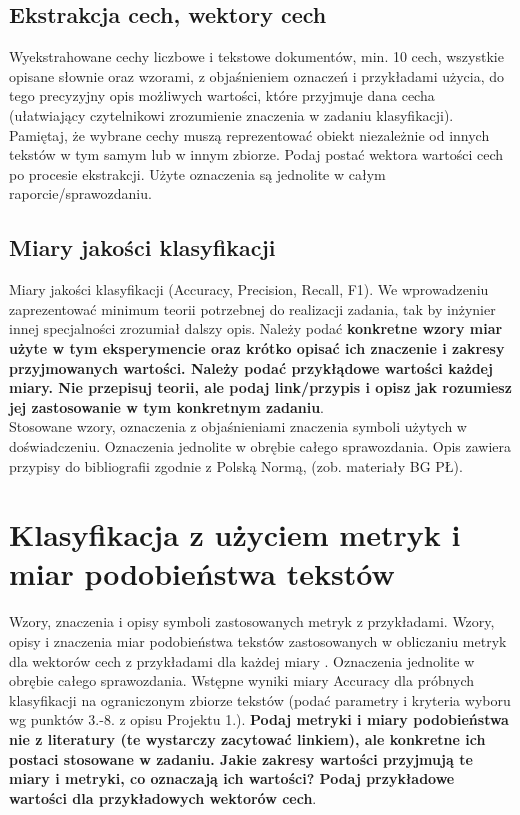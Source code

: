 \documentclass{classrep}
\begin{document}
\subsection{Ekstrakcja cech, wektory cech}
Wyekstrahowane cechy liczbowe i tekstowe dokumentów, min. 10 cech, wszystkie
opisane słownie oraz wzorami, z objaśnieniem oznaczeń i przykładami użycia, do
tego precyzyjny opis możliwych wartości, które przyjmuje dana cecha (ułatwiający
czytelnikowi zrozumienie znaczenia w zadaniu klasyfikacji). Pamiętaj, że wybrane
cechy muszą reprezentować obiekt niezależnie od innych tekstów w tym samym lub w
innym zbiorze. Podaj postać wektora wartości cech po procesie ekstrakcji. Użyte oznaczenia są jednolite w całym
raporcie/sprawozdaniu. \\ 

\subsection{Miary jakości klasyfikacji} 
Miary jakości klasyfikacji (Accuracy, Precision,
Recall, F1). We wprowadzeniu zaprezentować minimum teorii potrzebnej do realizacji
zadania, tak by inżynier innej specjalności zrozumiał dalszy opis. Należy podać {\bf konkretne wzory miar użyte w tym eksperymencie oraz krótko
opisać ich znaczenie i zakresy przyjmowanych wartości. Należy podać przykłądowe
wartości każdej miary. Nie przepisuj
teorii, ale podaj link/przypis i opisz jak rozumiesz jej zastosowanie w tym konkretnym
zadaniu}. \\
\indent Stosowane wzory, oznaczenia z objaśnieniami znaczenia symboli użytych w
doświadczeniu. Oznaczenia jednolite w obrębie całego sprawozdania.  Opis zawiera przypisy do bibliografii zgodnie z
Polską Normą, (zob. materiały BG PŁ).\\


\section{Klasyfikacja z użyciem metryk i miar podobieństwa tekstów}
Wzory, znaczenia i opisy symboli zastosowanych metryk z
przykładami. Wzory, opisy i znaczenia miar
podobieństwa tekstów zastosowanych w obliczaniu metryk dla wektorów cech z
przykładami dla każdej miary \cite{niewiadomski08}.  Oznaczenia jednolite w obrębie całego sprawozdania.  Wstępne wyniki miary Accuracy dla próbnych klasyfikacji na ograniczonym zbiorze tekstów (podać parametry i kryteria
wyboru wg punktów 3.-8. z opisu Projektu 1.). {\bf Podaj metryki i miary
podobieństwa nie z literatury (te wystarczy zacytować linkiem), ale konkretne ich
postaci stosowane w zadaniu. Jakie zakresy wartości przyjmują te miary i
metryki, co oznaczają ich wartości? Podaj przykładowe wartości dla przykładowych wektorów cech}. \\ 
\end{document}
